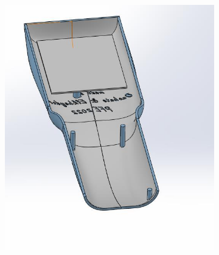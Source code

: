\begin{figure}[!htbp]
    \centering
    \begin{subfigure}{.5\linewidth}
        \centering
        \includegraphics[width=\linewidth]{assets/conception1/img213.jpg}
    \end{subfigure}
    \hfill
     \begin{subfigure}{.4\linewidth}
        \centering

\end{subfigure}
\end{figure}
